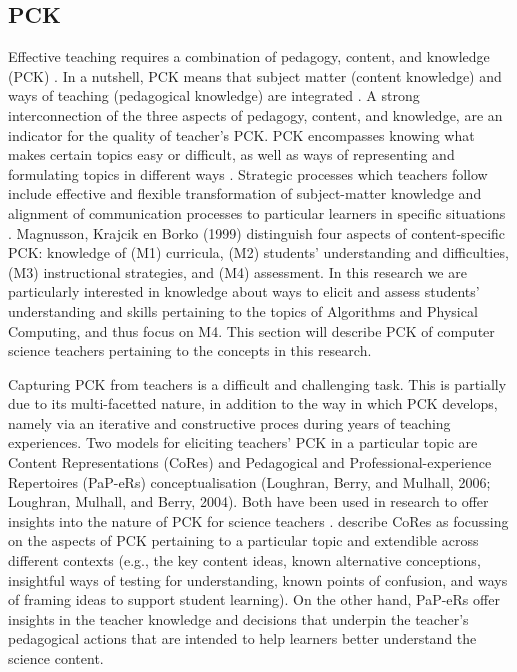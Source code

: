 \subsection{PCK}
Effective teaching requires a combination of pedagogy, content, and knowledge (PCK) \cite{shulman1986pedagogical}. In a nutshell, PCK means that subject matter (content knowledge) and ways of teaching (pedagogical knowledge) are integrated \cite{Yadav2016}.
A strong interconnection of the three aspects of  pedagogy, content, and knowledge, are an indicator for the quality of teacher's PCK. PCK encompasses knowing what makes certain topics easy or difficult, as well as ways of representing and formulating topics in different ways \cite{shulman1986pedagogical}. Strategic processes which teachers follow include effective and flexible transformation of subject-matter knowledge and alignment of communication processes to particular learners in specific situations \cite{shulman1986pedagogical}. Magnusson, Krajcik en Borko (1999) distinguish four aspects of content-specific PCK: knowledge of (M1) curricula, (M2) students' understanding and difficulties, (M3) instructional strategies, and (M4) assessment.  In this research we are particularly interested in knowledge about ways to elicit and assess students' understanding and skills pertaining to the topics of Algorithms and Physical Computing, and thus focus on M4. This section will describe PCK of computer science teachers pertaining to the concepts in this research.

Capturing PCK from teachers is a difficult and challenging task. This is partially due to its multi-facetted nature, in addition to the way in which PCK develops, namely via an iterative and constructive proces during years of teaching experiences. Two models for eliciting teachers' PCK in a particular topic are Content Representations (CoRes) and Pedagogical and Professional-experience Repertoires (PaP-eRs) conceptualisation (Loughran, Berry, and Mulhall, 2006; Loughran, Mulhall, and Berry, 2004). Both have been used in research to offer insights into the nature of PCK for science teachers \cite{loughran2008PCKscience}. \citeauthor{loughran2008PCKscience} describe CoRes as focussing on the aspects of PCK pertaining to a particular topic and extendible across different contexts (e.g., the key content ideas, known alternative conceptions, insightful ways of testing for understanding, known points of confusion, and ways of framing ideas to support student learning). On the other hand, PaP-eRs offer insights in the teacher knowledge and decisions that underpin the teacher's pedagogical actions that are intended to help learners better understand the science content.

